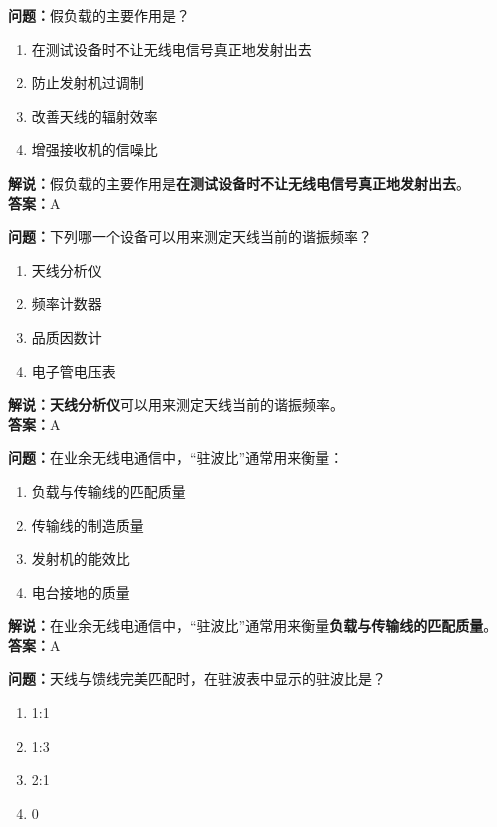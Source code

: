\textbf{问题：}假负载的主要作用是？

\begin{enumerate}[label=\Alph*), leftmargin=1.5cm]
	\item 在测试设备时不让无线电信号真正地发射出去
	\item 防止发射机过调制
	\item 改善天线的辐射效率
	\item 增强接收机的信噪比
\end{enumerate}

\textbf{解说：}假负载的主要作用是\textbf{在测试设备时不让无线电信号真正地发射出去}。\\\textbf{答案：}A



\textbf{问题：}下列哪一个设备可以用来测定天线当前的谐振频率？

\begin{enumerate}[label=\Alph*), leftmargin=1.5cm]
	\item 天线分析仪
	\item 频率计数器
	\item 品质因数计
	\item 电子管电压表
\end{enumerate}

\textbf{解说：}\textbf{天线分析仪}可以用来测定天线当前的谐振频率。\\\textbf{答案：}A



\textbf{问题：}在业余无线电通信中，“驻波比”通常用来衡量：

\begin{enumerate}[label=\Alph*), leftmargin=1.5cm]
	\item 负载与传输线的匹配质量
	\item 传输线的制造质量
	\item 发射机的能效比
	\item 电台接地的质量
\end{enumerate}

\textbf{解说：}在业余无线电通信中，“驻波比”通常用来衡量\textbf{负载与传输线的匹配质量}。\\\textbf{答案：}A



\textbf{问题：}天线与馈线完美匹配时，在驻波表中显示的驻波比是？

\begin{enumerate}[label=\Alph*), leftmargin=1.5cm]
	\item 1:1
	\item 1:3
	\item 2:1
	\item 0
\end{enumerate}

